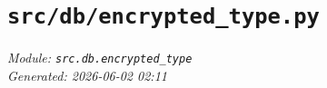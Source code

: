 
\section{\texttt{src/db/encrypted\_type.py}}
\textit{Module: \texttt{src.db.encrypted\_type}} \\
\textit{Generated: 2026-06-02 02:11} \\
